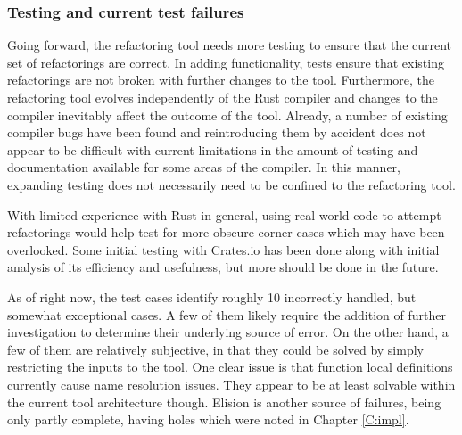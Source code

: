 
\subsubsection{Testing and current test failures}
Going forward, the refactoring tool needs more testing to ensure that the current set of refactorings are correct. In adding functionality, tests ensure that existing refactorings are not broken with further changes to the tool. Furthermore, the refactoring tool evolves independently of the Rust compiler and changes to the compiler inevitably affect the outcome of the tool. Already, a number of existing compiler bugs have been found and reintroducing them by accident does not appear to be difficult with current limitations in the amount of testing and documentation available for some areas of the compiler. In this manner, expanding testing does not necessarily need to be confined to the refactoring tool. 


With limited experience with Rust in general, using real-world code to attempt refactorings would help test for more obscure corner cases which may have been overlooked. Some initial testing with Crates.io \cite{cratesio15} has been done along with initial analysis of its efficiency and usefulness, but more should be done in the future. 


As of right now, the test cases identify roughly 10 incorrectly handled, but somewhat exceptional cases. A few of them likely require the addition of further investigation to determine their underlying source of error. On the other hand, a few of them are relatively subjective, in that they could be solved by simply restricting the inputs to the tool. One clear issue is that function local definitions currently cause name resolution issues. They appear to be at least solvable within the current tool architecture though. Elision is another source of failures, being only partly complete, having holes which were noted in Chapter \ref{C:impl}.

